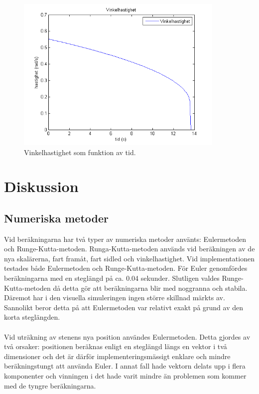 \documentclass[11pt]{article} %
\begin{document}
\begin{figure}[ht!]
\centering
\includegraphics[width=100mm]{vinkelhastighet_tid_graf.png}
\caption{Vinkelhastighet som funktion av tid.}
\label{fig:vinkelhast_graf}
\label{overflow}
\end{figure}


\section{Diskussion}

\subsection{Numeriska metoder}
Vid beräkningarna har två typer av numeriska metoder använts: Eulermetoden och
Runge-Kutta-metoden. Runga-Kutta-metoden används vid beräkningen av de nya skalärerna,
fart framåt, fart sidled och vinkelhastighet.
Vid implementationen testades både Eulermetoden och Runge-Kutta-metoden. 
För Euler genomfördes beräkningarna med en steglängd på ca. 0.04 sekunder. 
Slutligen valdes Runge-Kutta-metoden då detta gör att beräkningarna blir med noggranna och stabila. 
Däremot har i den visuella simuleringen ingen större skillnad märkts av. Sannolikt beror detta på att Eulermetoden var relativt exakt på grund av den korta steglängden. 
\\\\Vid uträkning av stenens nya position användes Eulermetoden. 
Detta gjordes av två orsaker: positionen beräknas enligt en steglängd längs en vektor i två dimensioner och det är därför implementeringsmässigt enklare och mindre beräkningstungt att använda Euler. 
I annat fall hade vektorn delats upp i flera komponenter och vinningen i det hade varit mindre än problemen som kommer med de tyngre beräkningarna. 
\end{document}
